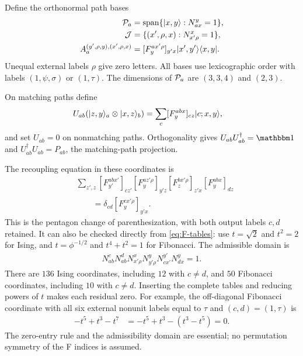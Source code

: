 Define the orthonormal path bases
\begin{align}
	\mathcal{P}_a & =\operatorname{span}\{\lvert x,y\rangle:N_{ax}^y=1\},  \\
	\mathcal{J}   & =\{(x',\rho,x):N_{x'\rho}^x=1\},               \\
	A_a^{(y',\rho,y),(x',\rho,x)}
	        & =[F^{a x'\rho}_{y}]_{y'x}\lvert x',y'\rangle\langle x,y\rvert.
	\label{eq:base-A}
\end{align}
Unequal external labels $\rho$ give zero letters. All bases use
lexicographic order with labels $(1,\psi,\sigma)$ or $(1,\tau)$.
The dimensions of $\mathcal{P}_a$ are $(3,3,4)$ and $(2,3)$.

On matching paths define
\begin{align}
	U_{ab}(\lvert z,y\rangle_a\otimes\lvert x,z\rangle_b)
	 & =\sum_c[F^{abx}_y]_{cz}\lvert c;x,y\rangle,
	\label{eq:path-U}
\end{align}
and set $U_{ab}=0$ on nonmatching paths.
Orthogonality gives $U_{ab}U_{ab}^\dagger=\Id$ and
$U_{ab}^\dagger U_{ab}=P_{ab}$, the matching-path projection.

The recoupling equation in these coordinates is
\begin{align}
	 & \sum_{z',z}
	   [F^{abx'}_{y'}]_{cz'}
	   [F^{a z'\rho}_{y}]_{y'z}
	   [F^{b x'\rho}_{z}]_{z'x}
	   [F^{abx}_{y}]_{dz}
	\nonumber                                      \\
	 & \qquad=\delta_{cd}[F^{c x'\rho}_{y}]_{y'x}.
	\label{eq:recoupling}
\end{align}
This is the pentagon change of parenthesization, with both output
labels $c,d$ retained. It can also be checked directly from
\cref{eq:F-tables}: use $t=\sqrt2$ and $t^2=2$ for Ising, and
$t=\phi^{-1/2}$ and $t^4+t^2=1$ for Fibonacci. The admissible domain is
\begin{align}
	N_{ab}^{c}N_{ab}^{d}N_{x'\rho}^{x}N_{y'\rho}^{y}
	N_{cx'}^{y'}N_{dx}^{y}=1.
\end{align}
There are $136$ Ising coordinates, including $12$ with $c\neq d$,
and $50$ Fibonacci coordinates, including $10$ with $c\neq d$.
Inserting the complete tables and reducing powers of $t$ makes
each residual zero. For example, the off-diagonal Fibonacci
coordinate with all six external nonunit labels equal to $\tau$
and $(c,d)=(1,\tau)$ is
\begin{align}
	-t^5+t^3-t^7
	 & =-t^5+t^3-(t^3-t^5)=0.
\end{align}
The zero-entry rule and the admissibility domain are essential;
no permutation symmetry of the F indices is assumed.

